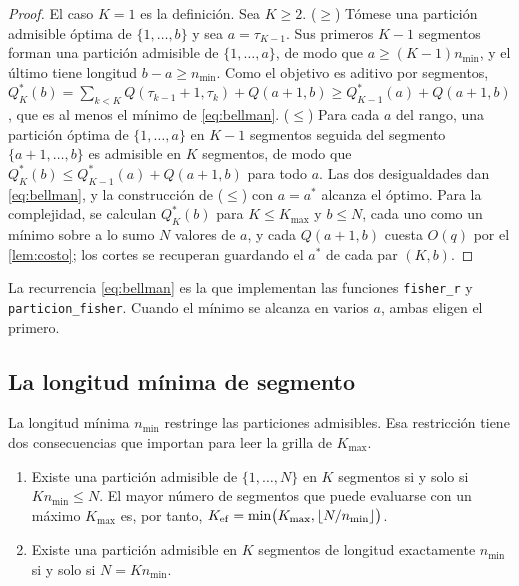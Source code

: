 \begin{proof}
El caso $K=1$ es la definición. Sea $K\ge2$. ($\ge$) Tómese una partición admisible óptima de
$\{1,\dots,b\}$ y sea $a=\tau_{K-1}$. Sus primeros $K-1$ segmentos forman una partición admisible
de $\{1,\dots,a\}$, de modo que $a\ge(K-1)n_{\min}$, y el último tiene longitud $b-a\ge n_{\min}$.
Como el objetivo es aditivo por segmentos,
$Q^\ast_K(b)=\sum_{k<K}Q(\tau_{k-1}+1,\tau_k)+Q(a+1,b)\ge Q^\ast_{K-1}(a)+Q(a+1,b)$, que es al
menos el mínimo de \cref{eq:bellman}. ($\le$) Para cada $a$ del rango, una partición óptima de
$\{1,\dots,a\}$ en $K-1$ segmentos seguida del segmento $\{a+1,\dots,b\}$ es admisible en $K$
segmentos, de modo que $Q^\ast_K(b)\le Q^\ast_{K-1}(a)+Q(a+1,b)$ para todo $a$. Las dos
desigualdades dan \cref{eq:bellman}, y la construcción de ($\le$) con $a=a^\ast$ alcanza el
óptimo. Para la complejidad, se calculan $Q^\ast_K(b)$ para $K\le K_{\max}$ y $b\le N$, cada uno
como un mínimo sobre a lo sumo $N$ valores de $a$, y cada $Q(a+1,b)$ cuesta $O(q)$ por el
\cref{lem:costo}; los cortes se recuperan guardando el $a^\ast$ de cada par $(K,b)$.
\end{proof}

La recurrencia \cref{eq:bellman} es la que implementan las funciones
\texttt{fisher\_r} y \texttt{particion\_fisher}. Cuando el mínimo se alcanza en varios $a$, ambas eligen el primero.

\subsection{La longitud mínima de segmento}
\label{sec:nmin}

La longitud mínima $n_{\min}$ restringe las particiones admisibles. Esa restricción tiene dos
consecuencias que importan para leer la grilla de $K_{\max}$.

\begin{corolario}\label{cor:fisher-factible}
\begin{enumerate}[label=(\alph*)]
  \item Existe una partición admisible de $\{1,\dots,N\}$ en $K$ segmentos si y solo si
    $Kn_{\min}\le N$. El mayor número de segmentos que puede evaluarse con un máximo $K_{\max}$
    es, por tanto, $K_{\mathrm{ef}}=\min\bigl(K_{\max},\lfloor N/n_{\min}\rfloor\bigr)$.
  \item Existe una partición admisible en $K$ segmentos de longitud exactamente $n_{\min}$ si y
    solo si $N=Kn_{\min}$.
\end{enumerate}
\end{corolario}

